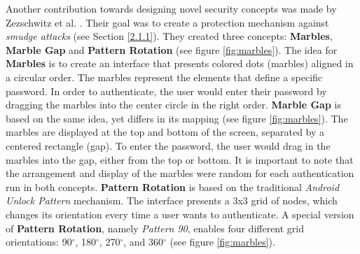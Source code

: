 Another contribution towards designing novel security concepts was made by Zezschwitz et al. \cite{Marbles}. Their goal was to create a protection mechanism against \textit{smudge attacks} (see Section \ref{2.1.1}). They created three concepts: \textbf{Marbles}, \textbf{Marble Gap} and \textbf{Pattern Rotation} (see figure \ref{fig:marbles}). The idea for \textbf{Marbles} is to create an interface that presents colored dots (marbles) aligned in a circular order. The marbles represent the elements that define a specific password. In order to authenticate, the user would enter their password by dragging the marbles into the center circle in the right order. \textbf{Marble Gap} is based on the same idea, yet differs in its mapping (see figure \ref{fig:marbles}). The marbles are displayed at the top and bottom of the screen, separated by a centered rectangle (gap). To enter the password, the user would drag in the marbles into the gap, either from the top or bottom. It is important to note that the arrangement and display of the marbles were random for each authentication run in both concepts. \textbf{Pattern Rotation} is based on the traditional \textit{Android Unlock Pattern} mechanism. The interface presents a 3x3 grid of nodes, which changes its orientation every time a user wants to authenticate. A special version of \textbf{Pattern Rotation}, namely \textit{Pattern 90}, enables four different grid orientations: 90$^\circ$, 180$^\circ$, 270$^\circ$, and 360$^\circ$ (see figure \ref{fig:marbles}). \\

